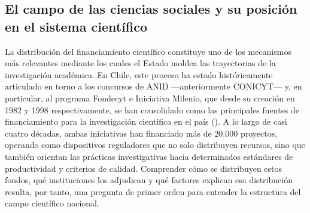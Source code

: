 \documentclass[
  12pt,
  letterpaper,
]{article}
\begin{document}
\begin{abstract}
Los hallazgos sugieren que el debate público sobre la existencia de una
``crisis'' del financiamiento requiere mayor precisión analítica: no
estamos ante un sistema en colapso, sino ante uno con techos
estructurales que se hacen más visibles a medida que la demanda crece
sin que el presupuesto agregado se expanda proporcionalmente. El estudio
plantea como hipótesis interpretativa para futuras investigaciones que
la alta productividad del campo se estaría sosteniendo, al menos en
parte, sobre el traslado de los costos del ajuste hacia las y los
investigadores ---particularmente quienes no cuentan con afiliación a
instituciones tradicionales, trayectorias consolidadas o ubicación
metropolitana---. Se proponen rutas de investigación complementaria que
combinen análisis cuantitativos con abordajes cualitativos sobre las
condiciones laborales y las trayectorias académicas del campo.
\end{abstract}


\subsection{El campo de las ciencias sociales y su posición en el
sistema
científico}\label{el-campo-de-las-ciencias-sociales-y-su-posiciuxf3n-en-el-sistema-cientuxedfico}

La distribución del financiamiento científico constituye uno de los
mecanismos más relevantes mediante los cuales el Estado moldea las
trayectorias de la investigación académica. En Chile, este proceso ha
estado históricamente articulado en torno a los concursos de ANID
---anteriormente CONICYT--- y, en particular, al programa Fondecyt e
Iniciativa Milenio, que desde su creación en 1982 y 1998
respectivamente, se han consolidado como las principales fuentes de
financiamiento para la investigación científica en el país
(). A lo
largo de casi cuatro décadas, ambas iniciativas han financiado más de
20.000 proyectos, operando como dispositivos reguladores que no solo
distribuyen recursos, sino que también orientan las prácticas
investigativas hacia determinados estándares de productividad y
criterios de calidad. Comprender cómo se distribuyen estos fondos, qué
instituciones los adjudican y qué factores explican esa distribución
resulta, por tanto, una pregunta de primer orden para entender la
estructura del campo científico nacional.
\end{document}
